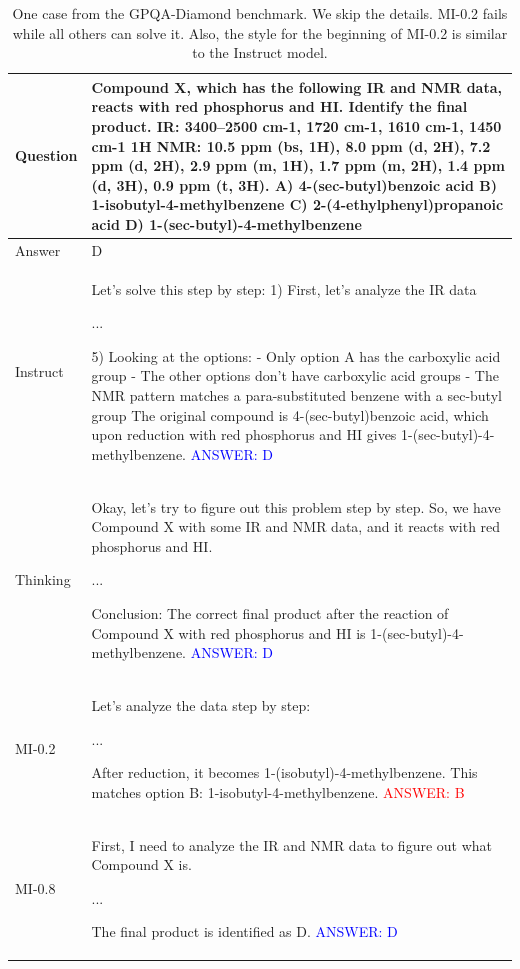 
\begin{table}[!t]
\begin{tabular}{lp{}}
\toprule
Question & 
Compound X, which has the following IR and NMR data, reacts with red phosphorus and HI. Identify the final product. IR: 3400–2500 cm-1, 1720 cm-1, 1610 cm-1, 1450 cm-1 1H NMR: 10.5 ppm (bs, 1H), 8.0 ppm (d, 2H), 7.2 ppm (d, 2H), 2.9 ppm (m, 1H), 1.7 ppm (m, 2H), 1.4 ppm (d, 3H), 0.9 ppm (t, 3H).  A) 4-(sec-butyl)benzoic acid B) 1-isobutyl-4-methylbenzene C) 2-(4-ethylphenyl)propanoic acid D) 1-(sec-butyl)-4-methylbenzene 
 \\
\midrule 
Answer & D \\
\midrule
Instruct & Let's solve this step by step:  1) First, let's analyze the IR data

...

5) Looking at the options: - Only option A has the carboxylic acid group - The other options don't have carboxylic acid groups - The NMR pattern matches a para-substituted benzene with a sec-butyl group  The original compound is 4-(sec-butyl)benzoic acid, which upon reduction with red phosphorus and HI gives 1-(sec-butyl)-4-methylbenzene.  \textcolor{blue}{ANSWER: D}
\\
\midrule
Thinking &  Okay, let's try to figure out this problem step by step. So, we have Compound X with some IR and NMR data, and it reacts with red phosphorus and HI. 

...

Conclusion: The correct final product after the reaction of Compound X with red phosphorus and HI is 1-(sec-butyl)-4-methylbenzene.  \textcolor{blue}{ANSWER: D}
 \\
\midrule
MI-0.2 & Let's analyze the data step by step:

...

After reduction, it becomes 1-(isobutyl)-4-methylbenzene.  This matches option B: 1-isobutyl-4-methylbenzene.  \textcolor{red}{ANSWER: B} 
\\
\midrule
MI-0.8 &  First, I need to analyze the IR and NMR data to figure out what Compound X is.

...

  The final product is identified as D.  \textcolor{blue}{ANSWER: D}
\\
\bottomrule
\end{tabular}
\caption{
One case from the GPQA-Diamond benchmark.
We skip the details.
MI-0.2 fails while all others can solve it.
Also, the style for the beginning of MI-0.2 is similar to the Instruct model.
}
\label{appdx:case2}
\end{table}